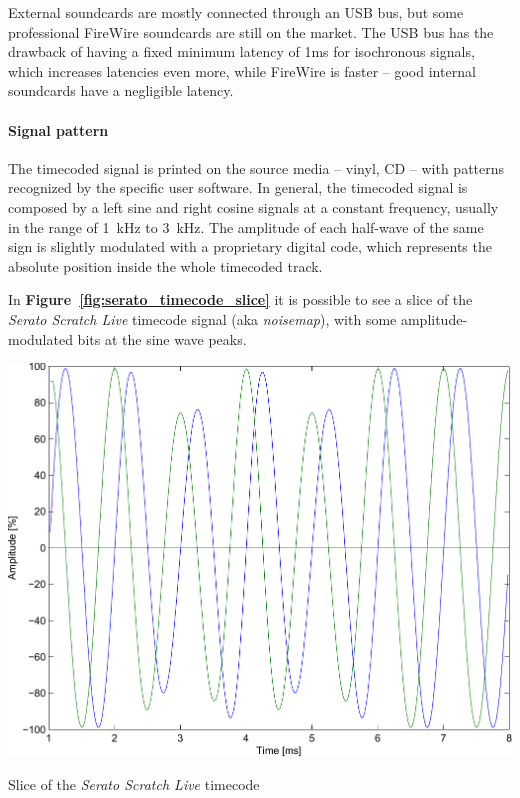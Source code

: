 \documentclass[a4paper,10pt]{article}
\makeatletter
\newenvironment{figurehere}{\def\@captype{figure}\vspace{2ex}}{\vspace{2ex}}
\makeatother
\begin{document}
\begin{multicols}{2}
External soundcards are mostly connected through an USB bus, but some
professional FireWire soundcards are still on the market. The USB bus has the
drawback of having a fixed minimum latency of 1ms for isochronous signals,
which increases latencies even more, while FireWire is faster -- good internal
soundcards have a negligible latency.


\paragraph{Signal pattern}
The timecoded signal is printed on the source media -- vinyl, CD -- with
patterns recognized by the specific user software. In general, the timecoded
signal is composed by a left sine and right cosine signals at a constant
frequency, usually in the range of 1~kHz to 3~kHz. The amplitude of each
half-wave of the same sign is slightly modulated with a proprietary digital
code, which represents the absolute position inside the whole timecoded track.

In \textbf{Figure~\ref{fig:serato_timecode_slice}} it is possible to see a
slice of the \emph{Serato Scratch Live} timecode signal (aka \emph{noisemap}),
with some amplitude-modulated bits at the sine wave peaks.

\begin{figurehere}
	\label{fig:serato_timecode_slice}
	\centering
	\includegraphics[keepaspectratio=true,width=\columnwidth]{images/serato_timecode_slice.pdf}
	\caption{Slice of the \emph{Serato Scratch Live} timecode}
\end{figurehere}


\end{multicols}
\end{document}
